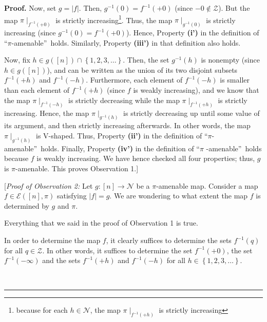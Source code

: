 \documentclass[numbers=enddot,12pt,final,onecolumn,notitlepage]{scrartcl}%
\theoremstyle{definition}
\newenvironment{proof}[1][Proof]{\noindent\textbf{#1.} }{\ \rule{0.5em}{0.5em}}
\newenvironment{vershort}{}{}
\begin{document}
\begin{vershort}
\begin{proof}
Now, set $g=\left\vert f\right\vert $. Then, $g^{-1}\left(  0\right)
=f^{-1}\left(  +0\right)  $ (since $-0\notin\mathcal{Z}$). But the map
$\pi\mid_{f^{-1}\left(  +0\right)  }$ is strictly increasing\footnote{because
for each $h\in\mathcal{N}$, the map $\pi\mid_{f^{-1}\left(  +h\right)  }$ is
strictly increasing}. Thus, the map $\pi\mid_{g^{-1}\left(  0\right)  }$ is
strictly increasing (since $g^{-1}\left(  0\right)  =f^{-1}\left(  +0\right)
$). Hence, Property \textbf{(i')} in the definition of \textquotedblleft$\pi
$-amenable\textquotedblright\ holds. Similarly, Property \textbf{(iii')} in
that definition also holds.

Now, fix $h\in g\left(  \left[  n\right]  \right)  \cap\left\{  1,2,3,\ldots
\right\}  $. Then, the set $g^{-1}\left(  h\right)  $ is nonempty (since $h\in
g\left(  \left[  n\right]  \right)  $), and can be written as the union of its
two disjoint subsets $f^{-1}\left(  +h\right)  $ and $f^{-1}\left(  -h\right)
$. Furthermore, each element of $f^{-1}\left(  -h\right)  $ is smaller than
each element of $f^{-1}\left(  +h\right)  $ (since $f$ is weakly increasing),
and we know that the map $\pi\mid_{f^{-1}\left(  -h\right)  }$ is strictly
decreasing while the map $\pi\mid_{f^{-1}\left(  +h\right)  }$ is strictly
increasing. Hence, the map $\pi\mid_{g^{-1}\left(  h\right)  }$ is strictly
decreasing up until some value of its argument, and then strictly increasing
afterwards. In other words, the map $\pi\mid_{g^{-1}\left(  h\right)  }$ is
V-shaped. Thus, Property \textbf{(ii')} in the definition of
\textquotedblleft$\pi$-amenable\textquotedblright\ holds. Finally, Property
\textbf{(iv')} in the definition of \textquotedblleft$\pi$%
-amenable\textquotedblright\ holds because $f$ is weakly increasing. We have
hence checked all four properties; thus, $g$ is $\pi$-amenable. This proves
Observation 1.]

[\textit{Proof of Observation 2:} Let $g:\left[  n\right]  \rightarrow
\mathcal{N}$ be a $\pi$-amenable map. Consider a map $f\in\mathcal{E}\left(
\left[  n\right]  ,\pi\right)  $ satisfying $\left\vert f\right\vert =g$. We
are wondering to what extent the map $f$ is determined by $g$ and $\pi$.

Everything that we said in the proof of Observation 1 is true.

In order to determine the map $f$, it clearly suffices to determine the sets
$f^{-1}\left(  q\right)  $ for all $q\in\mathcal{Z}$. In other words, it
suffices to determine the set $f^{-1}\left(  +0\right)  $, the set
$f^{-1}\left(  -\infty\right)  $ and the sets $f^{-1}\left(  +h\right)  $ and
$f^{-1}\left(  -h\right)  $ for all $h\in\left\{  1,2,3,\ldots\right\}  $.


\end{proof}
\end{vershort}
\end{document}
